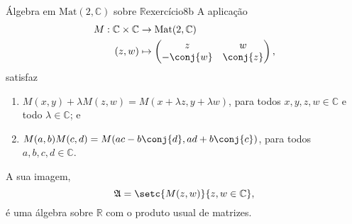 \begin{proposition}{Álgebra em \(\mathrm{Mat}(2, \mathbb{C})\) sobre \(\mathbb{R}\)}{exercício8b}
    A aplicação
    \begin{align*}
        M : \mathbb{C} \times \mathbb{C} &\to \mathrm{Mat}(2, \mathbb{C})\\
                                   (z,w) &\mapsto \begin{pmatrix}
                                             z & w\\
                                             -\conj{w} & \conj{z}
                                         \end{pmatrix},
    \end{align*}
    satisfaz
    \begin{enumerate}[label=(\alph*)]
        \item \(M(x, y) + \lambda M(z, w) = M(x + \lambda z, y + \lambda w)\), para todos \(x,y,z,w \in \mathbb{C}\) e todo \(\lambda \in \mathbb{C}\); e
        \item \(M(a,b)M(c,d) = M(ac - b\conj{d}, ad + b\conj{c})\), para todos \(a,b,c,d \in \mathbb{C}\).
    \end{enumerate}
    A sua imagem,
    \begin{equation*}
        \mathfrak{A} = \setc{M(z,w)}{z,w \in \mathbb{C}},
    \end{equation*}
    é uma álgebra sobre \(\mathbb{R}\) com o produto usual de matrizes.
\end{proposition}
